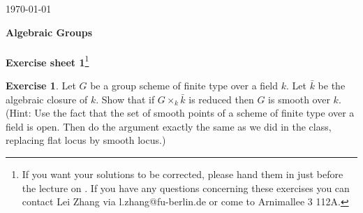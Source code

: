 \documentclass[12pt]{amsart}
\theoremstyle{plain}
\theoremstyle{definition}
\newtheorem{ex}{Exercise}
\numberwithin{Aufgabe}{section}
\begin{document}
\setdatetoday
\addtocounter{datenumber}{4}
\setdatebynumber{\thedatenumber}

\begin{flushright}\today
\end{flushright}
\begin{center}
 {\bf \Huge
Algebraic Groups}\\  
\vspace{0.5 cm}{\Large Dr. Lei Zhang}\\  
\vspace{0.7 cm}
{\bf\large Exercise sheet {1}}\footnote{ If you want your solutions to be corrected, please hand them in just before the lecture on \datedate. If you have any questions concerning these exercises you can contact Lei Zhang via l.zhang@fu-berlin.de or come to Arnimallee 3  112A. }\\
\end{center}

\begin{ex}
Let $G$ be a group scheme of finite type over a field $k$. Let $\bar{k}$ be the algebraic closure of $k$. Show that if $G\times_k\bar{k}$ is reduced then $G$ is smooth over $k$. (Hint: Use the fact that the set of smooth points of a scheme of finite type over a field is open. Then do the argument exactly the same as we did in the class, replacing flat locus by smooth locus.)
\end{ex} 
\end{document}
